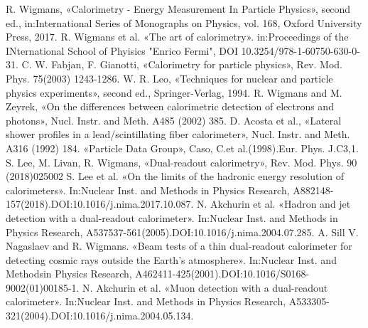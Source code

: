 \documentclass[a4paper,11pt,titlepage,oneside]{book}	%
\begin{document}
	\begin{backmatter}
		
		
		\begin{thebibliography}{99}
			
			
			  R. Wigmans, «Calorimetry - Energy Measurement In Particle Physics», second ed., in:International  Series  of  Monographs  on  Physics,  vol.  168,  Oxford  University  Press, 2017.
			 R. Wigmans et al. «The art of calorimetry». in:Proceedings of the INternational School of Phyisics "Enrico Fermi", DOI 10.3254/978-1-60750-630-0-31.
			  C.  W.  Fabjan,  F.  Gianotti, «Calorimetry  for  particle  physics»,  Rev.  Mod.  Phys.  75(2003) 1243-1286.
			  W. R. Leo, «Techniques for nuclear and particle physics experiments»,  second ed., Springer-Verlag, 1994.
			 R.  Wigmans  and  M.  Zeyrek, «On  the  differences  between  calorimetric  detection  of electrons and photons», Nucl. Instr. and Meth. A485 (2002) 385.
			 D. Acosta et al., «Lateral shower profiles in a lead/scintillating fiber calorimeter», Nucl. Instr. and Meth. A316 (1992) 184.
			 «Particle Data Group», Caso, C.et al.(1998).Eur. Phys. J.C3,1.
			 S. Lee, M. Livan, R. Wigmans, «Dual-readout calorimetry», Rev. Mod. Phys. 90 (2018)025002
			 S. Lee et al. «On the limits of the hadronic energy resolution of calorimeters». In:Nuclear Inst. and Methods in Physics Research, A882148-157(2018).DOI:10.1016/j.nima.2017.10.087.
			 N. Akchurin et al. «Hadron and jet detection with a dual-readout calorimeter». In:Nuclear Inst. and Methods in Physics Research, A537537-561(2005).DOI:10.1016/j.nima.2004.07.285.
			 A. Sill V. Nagaslaev and R. Wigmans. «Beam tests of a thin dual-readout calorimeter for detecting cosmic rays outside the Earth’s atmosphere». In:Nuclear Inst. and Methodsin Physics Research, A462411-425(2001).DOI:10.1016/S0168-9002(01)00185-1.
			 N. Akchurin et al. «Muon detection with a dual-readout calorimeter». In:Nuclear Inst. and Methods in Physics Research, A533305-321(2004).DOI:10.1016/j.nima.2004.05.134.

\end{thebibliography}
\end{backmatter}
\end{document}
